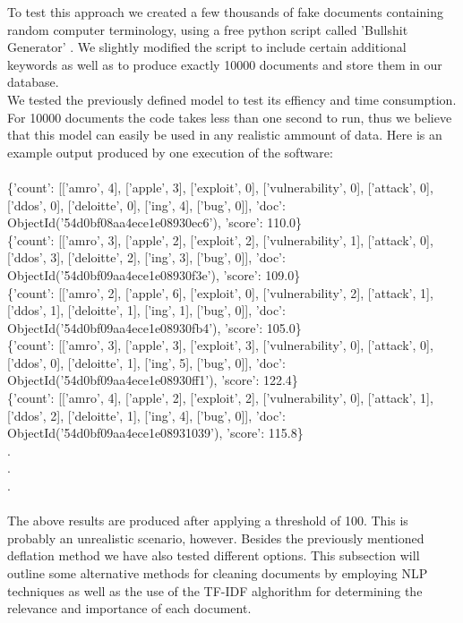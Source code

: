 \documentclass[12pt]{article}
\newcounter{subsubsubsection}[subsubsection]
\begin{document}
To test this approach we created a few thousands of fake documents containing random computer terminology, using a free python script called 'Bullshit Generator' \cite{bullgen}. We slightly modified the script to include certain additional keywords as well as to produce exactly 10000 documents and store them in our database. 
\hfill \break\\
We tested the previously defined model to test its effiency and time consumption. For 10000 documents the code takes less than one second to run, thus we believe that this model can easily be used in any realistic ammount of data. Here is an example output produced by one execution of the software:\\\\
\{'count': [['amro', 4], ['apple', 3], ['exploit', 0], ['vulnerability', 0], ['attack', 0], ['ddos', 0], ['deloitte', 0], ['ing', 4], ['bug', 0]], 'doc': ObjectId('54d0bf08aa4ece1e08930ec6'), 'score': 110.0\}\\
\{'count': [['amro', 3], ['apple', 2], ['exploit', 2], ['vulnerability', 1], ['attack', 0], ['ddos', 3], ['deloitte', 2], ['ing', 3], ['bug', 0]], 'doc': ObjectId('54d0bf09aa4ece1e08930f3e'), 'score': 109.0\}\\
\{'count': [['amro', 2], ['apple', 6], ['exploit', 0], ['vulnerability', 2], ['attack', 1], ['ddos', 1], ['deloitte', 1], ['ing', 1], ['bug', 0]], 'doc': ObjectId('54d0bf09aa4ece1e08930fb4'), 'score': 105.0\}\\
\{'count': [['amro', 3], ['apple', 3], ['exploit', 3], ['vulnerability', 0], ['attack', 0], ['ddos', 0], ['deloitte', 1], ['ing', 5], ['bug', 0]], 'doc': ObjectId('54d0bf09aa4ece1e08930ff1'), 'score': 122.4\}\\
\{'count': [['amro', 4], ['apple', 2], ['exploit', 2], ['vulnerability', 0], ['attack', 1], ['ddos', 2], ['deloitte', 1], ['ing', 4], ['bug', 0]], 'doc': ObjectId('54d0bf09aa4ece1e08931039'), 'score': 115.8\}\\
.\\
.\\
.\\
\hfill \break\\
The above results are produced after applying a threshold of 100. This is probably an unrealistic scenario, however. 
Besides the previously mentioned deflation method we have also tested different options. This subsection will outline some alternative methods for cleaning documents by employing NLP techniques as well as the use of the TF-IDF alghorithm for determining the relevance and importance of each document.
\end{document}
